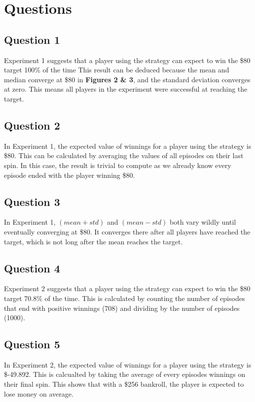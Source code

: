 \documentclass[
	letterpaper, %
]{jdf}
\begin{document}
\section{Questions}

\subsection{Question 1} 
Experiment 1 suggests that a player using the strategy can expect to win the \$80 target 100\% of the time
This result can be deduced because the mean and median converge at \$80 in \textbf{Figures 2 \& 3}, and the standard deviation converges at zero.
This means all players in the experiment were successful at reaching the target.

\subsection{Question 2}
In Experiment 1, the expected value of winnings for a player using the strategy is \$80.
This can be calculated by averaging the values of all episodes on their last spin.
In this case, the result is trivial to compute as we already know every episode ended with the player winning \$80.

\subsection{Question 3}
In Experiment 1, \((mean + std)\) and \((mean - std)\) both vary wildly until eventually converging at \$80.
It converges there after all players have reached the target, which is not long after the mean reaches the target.

\subsection{Question 4}
Experiment 2 suggests that a player using the strategy can expect to win the \$80 target 70.8\% of the time.
This is calculated by counting the number of episodes that end with positive winnings (708) and dividing by the number of episodes (1000).

\subsection{Question 5}
In Experiment 2, the expected value of winnings for a player using the strategy is \$-49.892.
This is calcualted by taking the average of every episodes winnings on their final spin.
This shows that with a \$256 bankroll, the player is expected to lose money on average.
\end{document}
